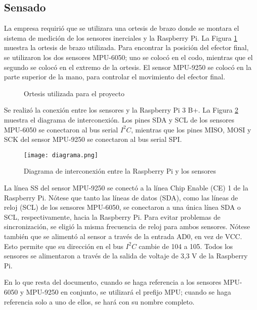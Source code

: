 \subsection{Sensado}

La empresa requirió que se utilizara una ortesis de brazo donde se montara el sistema de medición de los sensores inerciales y la Raspberry Pi. La Figura \ref{fig:ortesis} muestra la ortesis de brazo utilizada. Para encontrar la posición del efector final, se utilizaron los dos sensores MPU-6050; uno se colocó en el codo, mientras que el segundo se colocó en el extremo de la ortesis. El sensor MPU-9250 se colocó en la parte superior de la mano, para controlar el movimiento del efector final.

\begin{figure}[htb]
	\centering
	\caption{Ortesis utilizada para el proyecto}
	\label{fig:ortesis}
\end{figure}

Se realizó la conexión entre los sensores y la Raspberry Pi 3 B+. La Figura \ref{fig:diagrama} muestra el diagrama de interconexión. Los pines SDA y SCL de los sensores MPU-6050 se conectaron al bus serial $I^2C$, mientras que los pines MISO, MOSI y SCK del sensor MPU-9250 se conectaron al bus serial SPI.

\begin{figure}[htb]
	\centering
	\texttt{[image: diagrama.png]}
	\caption{Diagrama de interconexión entre la Raspberry Pi y los sensores}
	\label{fig:diagrama}
\end{figure}

La línea SS del sensor MPU-9250 se conectó a la línea Chip Enable (CE) 1 de la Raspberry Pi. Nótese que tanto las líneas de datos (SDA), como las líneas de reloj (SCL) de los sensores MPU-6050, se conectaron a una única línea SDA o SCL, respectivamente, hacia la Raspberry Pi. Para evitar problemas de sincronización, se eligió la misma frecuencia de reloj para ambos sensores. Nótese también que se alimentó al sensor a través de la entrada AD0, en vez de VCC. Esto permite que su dirección en el bus $I^2C$ cambie de 104 a 105. Todos los sensores se alimentaron a través de la salida de voltaje de 3,3 V de la Raspberry Pi.

En lo que resta del documento, cuando se haga referencia a los sensores MPU-6050 y MPU-9250 en conjunto, se utilizará el prefijo MPU; cuando se haga referencia solo a uno de ellos, se hará con su nombre completo.

